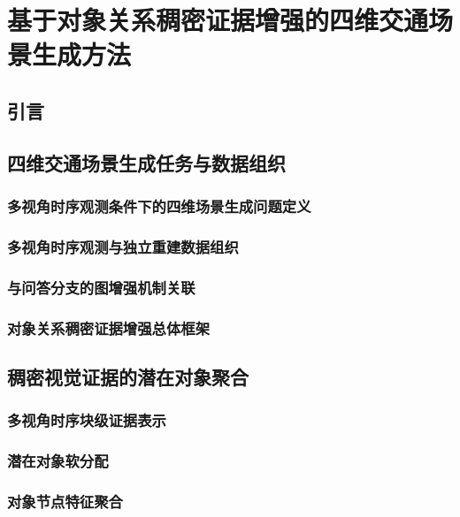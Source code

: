 
\chapter{基于对象关系稠密证据增强的四维交通场景生成方法}

\section{引言}

\section{四维交通场景生成任务与数据组织}

\subsection{多视角时序观测条件下的四维场景生成问题定义}

\subsection{多视角时序观测与独立重建数据组织}

\subsection{与问答分支的图增强机制关联}

\subsection{对象关系稠密证据增强总体框架}

\section{稠密视觉证据的潜在对象聚合}

\subsection{多视角时序块级证据表示}

\subsection{潜在对象软分配}

\subsection{对象节点特征聚合}

